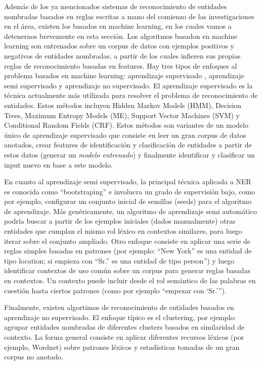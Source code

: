 Además de los ya mencionados sistemas de reconocimiento de entidades nombradas basados en reglas escritas a mano del comienzo de las investigaciones en el área, existen los basados en machine learning, en los cuales vamos a detenernos brevemente en esta sección. Los algoritmos basadon en machine learning son entrenados sobre un corpus de datos con ejemplos positivos y negativos de entidades nombradas, a partir de los cuales infieren sus propias reglas de reconocimiento basadas en features. Hay tres tipos de enfoques al problema basados en machine learning: aprendizaje supervisado , aprendizaje semi supervisado y aprendizaje no supervisado.
El aprendizaje supervisado es la técnica actualmente más utilizada para resolver el problema de reconocimiento de entidades. Estos métodos incluyen Hidden Markov Models (HMM), Decision Trees, Maximum Entropy Models (ME), Support Vector Machines (SVM)  y Conditional Random Fields (CRF). Estos métodos son variantes de un modelo único de aprendizaje supervisado que consiste en leer un gran corpus de datos anotados, crear features de identificación y clasificación de entidades a partir de estos datos (generar un \textit{modelo entrenado}) y finalmente identificar y clasificar un input nuevo en base a este modelo. 

En cuanto al aprendizaje semi supervisado, la principal técnica aplicada a NER es conocida como “bootstraping” e involucra un grado de supervisión bajo, como por ejemplo, configurar un conjunto inicial de semillas (seeds) para el algoritmo de aprendizaje. Más genéricamente, un algoritmo de aprendizaje semi automático podría buscar a partir de los ejemplos iniciales (dados manualmente) otras entidades que cumplan el mismo rol léxico en contextos similares, para luego iterar sobre el conjunto ampliado.
Otro enfoque consiste en aplicar una serie de reglas simples basadas en patrones (por ejemplo: “New York” es una entidad de tipo location; si empieza con “Sr.” es una entidad de tipo person”) y luego identificar contextos de uso común sobre un corpus para generar reglas basadas en contextos. Un contexto puede incluir desde el rol semántico de las palabras en cuestión hasta ciertos patrones (como por ejemplo “empezar con ‘Sr.’”).

Finalmente, existen algortimos de reconocimiento de entidades basados en aprendizaje no supervisado. El enfoque típico es el clustering, por ejemplo: agrupar entidades nombradas de diferentes clusters basados en similaridad de contexto.  La forma general consiste en aplicar diferentes recursos léxicos (por ejemplo, Wordnet) sobre patrones léxicos y estadísticas tomadas de un gran corpus no anotado. 

